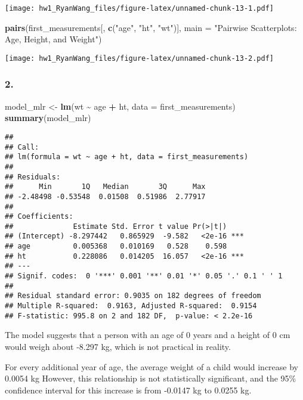 \documentclass[
]{article}
\newenvironment{Shaded}{\begin{snugshade}}{\end{snugshade}}
\newcommand{\AttributeTok}[1]{\textcolor[rgb]{0.13,0.29,0.53}{#1}}
\newcommand{\FunctionTok}[1]{\textcolor[rgb]{0.13,0.29,0.53}{\textbf{#1}}}
\newcommand{\NormalTok}[1]{#1}
\newcommand{\OtherTok}[1]{\textcolor[rgb]{0.56,0.35,0.01}{#1}}
\newcommand{\SpecialCharTok}[1]{\textcolor[rgb]{0.81,0.36,0.00}{\textbf{#1}}}
\newcommand{\StringTok}[1]{\textcolor[rgb]{0.31,0.60,0.02}{#1}}
\begin{document}
\texttt{[image: hw1\_RyanWang\_files/figure-latex/unnamed-chunk-13-1.pdf]}

\begin{Shaded}
\begin{Highlighting}[]
\FunctionTok{pairs}\NormalTok{(first\_measurements[, }\FunctionTok{c}\NormalTok{(}\StringTok{"age"}\NormalTok{, }\StringTok{"ht"}\NormalTok{, }\StringTok{"wt"}\NormalTok{)],}
\AttributeTok{main =} \StringTok{"Pairwise Scatterplots: Age, Height, and Weight"}\NormalTok{)}
\end{Highlighting}
\end{Shaded}

\texttt{[image: hw1\_RyanWang\_files/figure-latex/unnamed-chunk-13-2.pdf]}

\subsubsection{2.}\label{section-13}

\begin{Shaded}
\begin{Highlighting}[]
\NormalTok{model\_mlr }\OtherTok{\textless{}{-}} \FunctionTok{lm}\NormalTok{(wt }\SpecialCharTok{\textasciitilde{}}\NormalTok{ age }\SpecialCharTok{+}\NormalTok{ ht, }\AttributeTok{data =}\NormalTok{ first\_measurements)}
\FunctionTok{summary}\NormalTok{(model\_mlr)}
\end{Highlighting}
\end{Shaded}

\begin{verbatim}
## 
## Call:
## lm(formula = wt ~ age + ht, data = first_measurements)
## 
## Residuals:
##      Min       1Q   Median       3Q      Max 
## -2.48498 -0.53548  0.01508  0.51986  2.77917 
## 
## Coefficients:
##              Estimate Std. Error t value Pr(>|t|)    
## (Intercept) -8.297442   0.865929  -9.582   <2e-16 ***
## age          0.005368   0.010169   0.528    0.598    
## ht           0.228086   0.014205  16.057   <2e-16 ***
## ---
## Signif. codes:  0 '***' 0.001 '**' 0.01 '*' 0.05 '.' 0.1 ' ' 1
## 
## Residual standard error: 0.9035 on 182 degrees of freedom
## Multiple R-squared:  0.9163, Adjusted R-squared:  0.9154 
## F-statistic: 995.8 on 2 and 182 DF,  p-value: < 2.2e-16
\end{verbatim}

The model suggests that a person with an age of 0 years and a height of
0 cm would weigh about -8.297 kg, which is not practical in reality.

For every additional year of age, the average weight of a child would
increase by 0.0054 kg However, this relationship is not statistically
significant, and the 95\% confidence interval for this increase is from
-0.0147 kg to 0.0255 kg.
\end{document}
